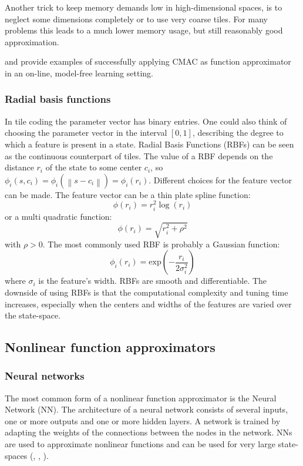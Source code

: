 \documentclass[a4paper,11pt]{mscLiterature}
\begin{document}
	Another trick to keep memory demands low in high-dimensional spaces, is to neglect some dimensions completely or to use very coarse tiles. For many problems this leads to a much lower memory usage, but still reasonably good approximation.
	
	\cite{Sutton:96} and \cite{Boone:97} provide examples of successfully applying CMAC as function approximator in an on-line, model-free learning setting. 
	

	\subsubsection{Radial basis functions}
	In tile coding the parameter vector has binary entries. One could also think of choosing the parameter vector in the interval $[0,1]$, describing the degree to which a feature is present in a state. Radial Basis Functions (RBFs) can be seen as the continuous counterpart of tiles. The value of a RBF depends on the distance $r_i$ of the state to some center $c_i$, so $\phi_i(s,c_i) = \phi_i(\left\|s-c_i\right\|) = \phi_i(r_i)$.	Different choices for the feature vector can be made. The feature vector can be a thin plate spline function:
	\begin{equation}
		\phi(r_i) = r_i^2 \log(r_i)
	\end{equation}
	or a multi quadratic function:
	\begin{equation}
		\phi(r_i) = \sqrt{r_i^2 + \rho^2}
	\end{equation}
	with $\rho>0$. The most commonly used RBF is probably a Gaussian function:
	\begin{equation}
		\phi_i(r_i) = \textrm{exp} \left( -\frac{r_i}{2\sigma_i^2} \right)
	\end{equation}
	where $\sigma_i$ is the feature's width. RBFs are smooth and differentiable. The downside of using RBFs is that the computational complexity and tuning time increases, especially when the centers and widths of the features are varied over the state-space.
	
\subsection{Nonlinear function approximators}

\subsubsection{Neural networks}
The most common form of a nonlinear function approximator is the Neural Network (NN). The architecture of a neural network consists of several inputs, one or more outputs and one or more hidden layers. A network is trained by adapting the weights of the connections between the nodes in the network. NNs are used to approximate nonlinear functions and can be used for very large state-spaces (\cite{Gaskett:99}, \cite{RandlovAlstrom:98}, \cite{Riedmiller:05}).
\end{document}
